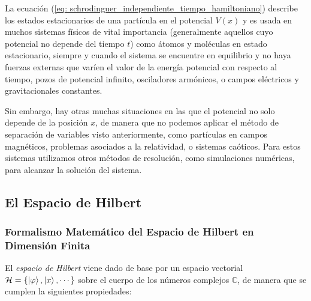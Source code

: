 \documentclass{article}
\numberwithin{equation}{section} %
\begin{document}
    \vspace{5mm}

    La ecuación (\ref{eq: schrodinguer_independiente_tiempo_hamiltoniano}) describe los estados estacionarios de una partícula en el potencial \( V(x) \) y es usada en muchos sistemas físicos de vital importancia (generalmente aquellos cuyo potencial no depende del tiempo \( t \)) como átomos y moléculas en estado estacionario, siempre y cuando el sistema se encuentre en equilibrio y no haya fuerzas externas que varíen el valor de la energía potencial con respecto al tiempo, pozos de potencial infinito, osciladores armónicos, o campos eléctricos y gravitacionales constantes.

    \vspace{5mm}

    Sin embargo, hay otras muchas situaciones en las que el potencial no solo depende de la posición \( x \), de manera que no podemos aplicar el método de separación de variables visto anteriormente, como partículas en campos magnéticos, problemas asociados a la relatividad, o sistemas caóticos. Para estos sistemas utilizamos otros métodos de resolución, como simulaciones numéricas, para alcanzar la solución del sistema.

    \vspace{5mm}

    \subsection{El Espacio de Hilbert}
    \subsubsection{Formalismo Matemático del Espacio de Hilbert en Dimensión Finita}

    \vspace{5mm}

    El \textit{espacio de Hilbert} viene dado de base por un espacio vectorial \( \mathcal{H} = \{ \ket{\varphi}, \ket{x}, \cdots \} \) sobre el cuerpo de los números complejos \( \mathbb{C} \), de manera que se cumplen la siguientes propiedades:
\end{document}
